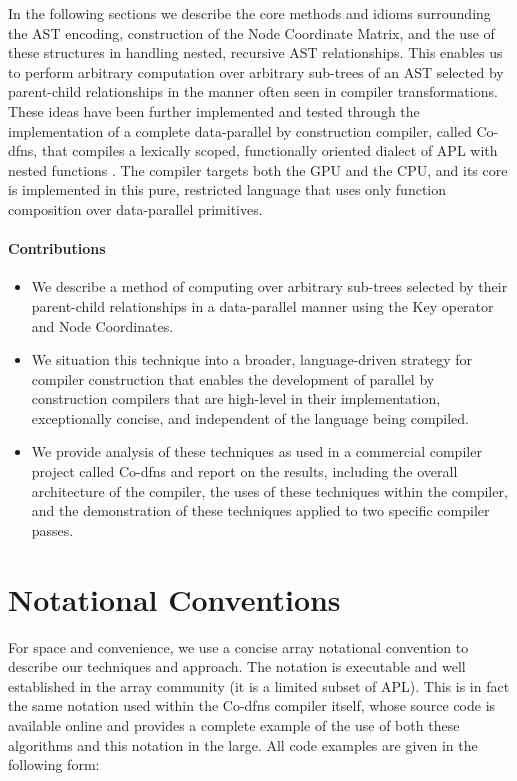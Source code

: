 \documentclass[numbers,9pt]{sigplanconf}
\begin{document}
In the following sections we describe the core methods and idioms surrounding 
the AST encoding, construction of the Node Coordinate Matrix, and the use 
of these structures in handling nested, recursive AST relationships. This 
enables us to perform arbitrary computation over arbitrary sub-trees of an 
AST selected by parent-child relationships in the manner often seen in 
compiler transformations. These ideas have been further implemented and tested 
through the implementation of a complete data-parallel by construction 
compiler, called Co-dfns, that compiles a lexically scoped, functionally 
oriented dialect of APL with nested functions 
\cite{hsu2014co,hsu2015accelerating}.
The compiler targets both the
GPU and the CPU, and its core is implemented in this pure, restricted 
language that uses only function composition over data-parallel primitives. 

\paragraph{Contributions}

\begin{itemize}[noitemsep]

\item We describe a method of computing over arbitrary sub-trees
selected by their parent-child relationships in a data-parallel manner
using the Key operator and Node Coordinates.

\item We situation this technique into a broader, language-driven 
strategy for compiler construction that enables the development of parallel 
by construction compilers that are high-level in their implementation, 
exceptionally concise, and independent of the language being compiled.

\item We provide analysis of these techniques as used in a commercial
compiler project called Co-dfns and report on the results,
including the overall architecture of the compiler, the uses of these 
techniques within the compiler, and the demonstration of these techniques 
applied to two specific compiler passes.

\end{itemize}

\section{Notational Conventions}

For space and convenience, we use a concise array notational convention to 
describe our techniques and approach. The notation is executable and well 
established in the array community (it is a limited subset of APL). This is 
in fact the same notation used within the Co-dfns compiler itself, whose 
source code is available online and provides a complete example of the use 
of both these algorithms and this notation in the large. 
All code examples are given in the following form:
\end{document}
